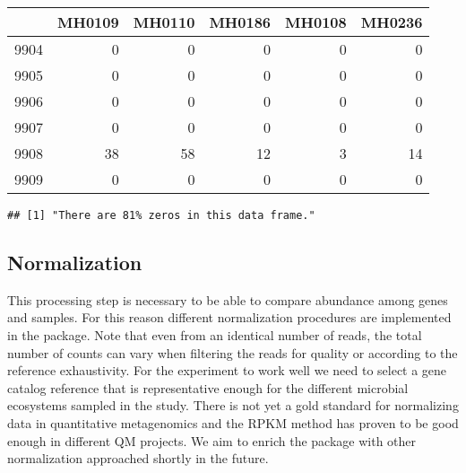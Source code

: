 \documentclass[]{article}
\newenvironment{Shaded}{\begin{snugshade}}{\end{snugshade}}
\newcommand{\KeywordTok}[1]{\textcolor[rgb]{0.13,0.29,0.53}{\textbf{{#1}}}}
\newcommand{\DataTypeTok}[1]{\textcolor[rgb]{0.13,0.29,0.53}{{#1}}}
\newcommand{\DecValTok}[1]{\textcolor[rgb]{0.00,0.00,0.81}{{#1}}}
\newcommand{\StringTok}[1]{\textcolor[rgb]{0.31,0.60,0.02}{{#1}}}
\newcommand{\NormalTok}[1]{{#1}}
\begin{document}
\begin{longtable}[c]{@{}lrrrrr@{}}
\toprule
& MH0109 & MH0110 & MH0186 & MH0108 & MH0236\tabularnewline
\midrule
\endhead
9904 & 0 & 0 & 0 & 0 & 0\tabularnewline
9905 & 0 & 0 & 0 & 0 & 0\tabularnewline
9906 & 0 & 0 & 0 & 0 & 0\tabularnewline
9907 & 0 & 0 & 0 & 0 & 0\tabularnewline
9908 & 38 & 58 & 12 & 3 & 14\tabularnewline
9909 & 0 & 0 & 0 & 0 & 0\tabularnewline
\bottomrule
\end{longtable}

\begin{Shaded}
\end{Shaded}

\begin{verbatim}
## [1] "There are 81% zeros in this data frame."
\end{verbatim}

\subsection{Normalization}\label{normalization}

This processing step is necessary to be able to compare abundance among
genes and samples. For this reason different normalization procedures
are implemented in the package. Note that even from an identical number
of reads, the total number of counts can vary when filtering the reads
for quality or according to the reference exhaustivity. For the
experiment to work well we need to select a gene catalog reference that
is representative enough for the different microbial ecosystems sampled
in the study. There is not yet a gold standard for normalizing data in
quantitative metagenomics and the RPKM method has proven to be good
enough in different QM projects. We aim to enrich the package with other
normalization approached shortly in the future.
\end{document}
